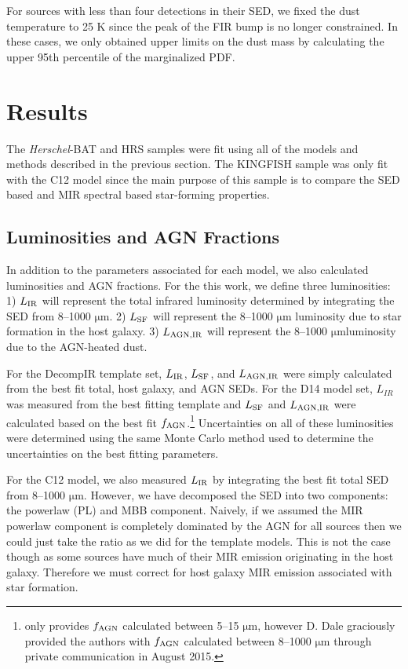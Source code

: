 \documentclass[fleqn,usenatbib]{mnras}
\newcommand{\herschel}{\emph{Herschel}}
\newcommand{\um}{$\mathrm{\mu}$m}
\begin{document}
For sources with less than four detections in their SED, we fixed the dust temperature to 25 K since the peak of the FIR bump is no longer constrained. In these cases, we only obtained upper limits on the dust mass by calculating the upper 95th percentile of the marginalized PDF.

\section{Results}
The \herschel-BAT and HRS samples were fit using all of the models and methods described in the previous section. The KINGFISH sample was only fit with the C12 model since the main purpose of this sample is to compare the SED based and MIR spectral based star-forming properties. 

\subsection{Luminosities and AGN Fractions}
In addition to the parameters associated for each model, we also calculated luminosities and AGN fractions. For the this work, we define three luminosities: 1) $L_{\rm IR}$ will represent the total infrared luminosity determined by integrating the SED from 8--1000 \um. 2) $L_{\rm SF}$ will represent the 8--1000 \um{} luminosity due to star formation in the host galaxy. 3) $L_{\rm AGN, IR}$ will represent the 8--1000 \um luminosity due to the AGN-heated dust. 

For the DecompIR template set, $L_{\rm IR}$, $L_{\rm SF}$, and $L_{\rm AGN, IR}$ were simply calculated from the best fit total, host galaxy, and AGN SEDs. For the D14 model set, $L_{IR}$ was measured from the best fitting template and $L_{\rm SF}$ and $L_{\rm AGN, IR}$ were calculated based on the best fit $f_{\rm AGN}$.\footnote{\citet{Dale:2014yq} only provides $f_{\rm AGN}$ calculated between 5--15 \um, however D. Dale graciously provided the authors with $f_{\rm AGN}$ calculated between 8--1000 \um{} through private communication in August 2015.} Uncertainties on all of these luminosities were determined using the same Monte Carlo method used to determine the uncertainties on the best fitting parameters.

For the C12 model, we also measured $L_{\rm IR}$ by integrating the best fit total SED from 8--1000 \um. However, we have decomposed the SED into two components: the powerlaw (PL) and MBB component. Naively, if we assumed the MIR powerlaw component is completely dominated by the AGN for all sources then we could just take the ratio as we did for the template models. This is not the case though as some sources have much of their MIR emission originating in the host galaxy. Therefore we must correct for host galaxy MIR emission associated with star formation.
\end{document}

